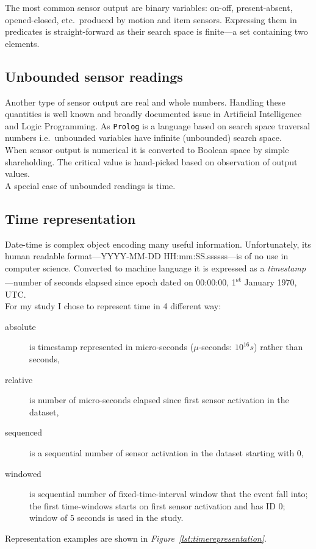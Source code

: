 \documentclass[11pt, a4paper, pdflatex, leqno, twoside, openright]{report}
\newcommand{\ts}{\textsuperscript}
\begin{document}
The most common sensor output are binary variables: on-off, present-absent, opened-closed, etc.\ produced by motion and item sensors. Expressing them in predicates is straight-forward as their search space is finite---a set containing two elements.

    \subsection{Unbounded sensor readings}
Another type of sensor output are real and whole numbers. Handling these quantities is well known and broadly documented issue in Artificial Intelligence and Logic Programming. As \texttt{Prolog} is a language based on search space traversal numbers i.e.\ unbounded variables have infinite (unbounded) search space.\\

When sensor output is numerical it is converted to Boolean space by simple shareholding. The critical value is hand-picked based on observation of output values.\\
A special case of unbounded readings is time.

    \subsection{Time representation\label{sec:timeRepresentation}}
Date-time is complex object encoding many useful information. Unfortunately, its human readable format---YYYY-MM-DD HH:mm:SS.ssssss---is of no use in computer science. Converted to machine language it is expressed as a \emph{timestamp}---number of seconds elapsed since epoch dated on 00:00:00, 1\ts{st} January 1970, UTC.\\

For my study I chose to represent time in 4 different way:
\begin{description}
\item[absolute] is timestamp represented in micro-seconds ($\mu$-seconds: $10^{16}s$) rather than seconds,
\item[relative] is number of micro-seconds elapsed since first sensor activation in the dataset,
\item[sequenced] is a sequential number of sensor activation in the dataset starting with $0$,
\item[windowed] is sequential number of fixed-time-interval window that the event fall into; the first time-windows starts on first sensor activation and has ID $0$; window of 5 seconds is used in the study.
\end{description}
Representation examples are shown in \emph{Figure~\ref{lst:timerepresentation}}.\\
\end{document}
